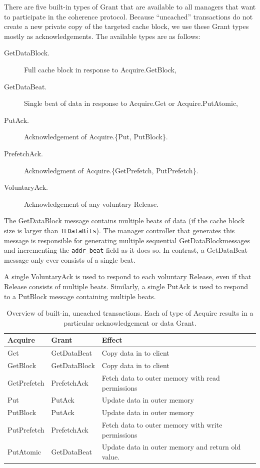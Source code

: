 There are five built-in types of Grant that are available to all managers that want to participate in the coherence protocol.
Because ``uncached'' transactions do not create a new private copy of the targeted cache block, we use these Grant types mostly as acknowledgements.
The available types are as follows:
\begin{description}
\item[GetDataBlock.] Full cache block in response to Acquire.GetBlock,
\item[GetDataBeat.] Single beat of data in response to Acquire.Get or Acquire.PutAtomic,
\item[PutAck.] Acknowledgement of Acquire.\{Put, PutBlock\}.
\item[PrefetchAck.] Acknowledgment of Acquire.\{GetPrefetch, PutPrefetch\}.
\item[VoluntaryAck.] Acknowledgement of any voluntary Release.
\end{description}

The GetDataBlock message contains multiple beats of data (if the cache block size is larger than {\tt TLDataBits}).
The manager controller that generates this message is responsible for generating multiple sequential GetDataBlockmessages and incrementing the {\tt addr\_beat} field as it does so.
In contrast, a GetDataBeat message only ever consists of a single beat.

A single VoluntaryAck is used to respond to each voluntary Release, even if that Release consists of multiple beats.
Similarly, a single PutAck is used to respond to a PutBlock message containing multiple beats.

\begin{table}[ht]
\begin{center}
\begin{tabular}{|l|l|l|}
    \hline
    Acquire & Grant & Effect \\ \hline \hline
    Get & GetDataBeat & Copy data in to client \\ \hline
    GetBlock & GetDataBlock & Copy data in to client \\ \hline
    GetPrefetch & PrefetchAck & Fetch data to outer memory with read permissions \\ \hline
    Put & PutAck & Update data in outer memory \\ \hline
    PutBlock & PutAck & Update data in outer memory \\ \hline
    PutPrefetch & PrefetchAck & Fetch data to outer memory with write permissions \\ \hline
    PutAtomic & GetDataBeat & Update data in outer memory and return old value. \\ \hline
\end{tabular}
\end{center}
\caption{Overview of built-in, uncached transactions. Each of type of Acquire results in a particular acknowledgement or data Grant.}
\label{tab:uncached}
\end{table}

